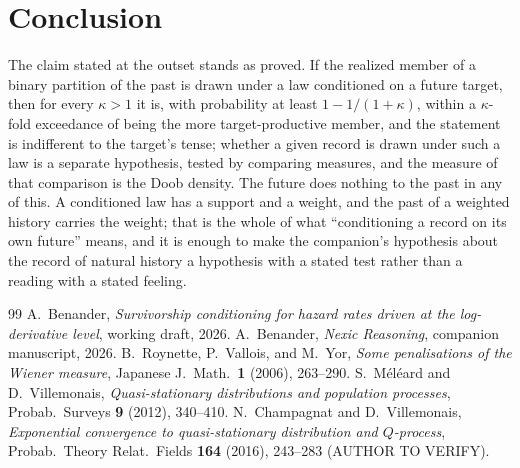 \documentclass[11pt]{article}
\theoremstyle{plain}
\theoremstyle{definition}
\theoremstyle{remark}
\begin{document}
\section{Conclusion}\label{sec:conclusion}

The claim stated at the outset stands as proved. If the realized member
of a binary partition of the past is drawn under a law conditioned on a
future target, then for every $\kappa>1$ it is, with probability at least
$1-1/(1+\kappa)$, within a $\kappa$-fold exceedance of being the more
target-productive member, and the statement is indifferent to the
target's tense; whether a given record is drawn under such a law is a
separate hypothesis, tested by comparing measures, and the measure of
that comparison is the Doob density. The future does nothing to the past
in any of this. A conditioned law has a support and a weight, and the
past of a weighted history carries the weight; that is the whole of what
``conditioning a record on its own future'' means, and it is enough to
make the companion's hypothesis about the record of natural history a
hypothesis with a stated test rather than a reading with a stated
feeling.

\begin{thebibliography}{99}\small
{} A.~Benander, \emph{Survivorship conditioning for hazard
rates driven at the log-derivative level}, working draft, 2026.
 A.~Benander, \emph{Nexic Reasoning}, companion manuscript,
2026.
 B.~Roynette, P.~Vallois, and M.~Yor, \emph{Some penalisations
of the Wiener measure}, Japanese J.\ Math.\ \textbf{1} (2006), 263--290.
 S.~M\'el\'eard and D.~Villemonais, \emph{Quasi-stationary
distributions and population processes}, Probab.\ Surveys \textbf{9} (2012),
340--410.
 N.~Champagnat and D.~Villemonais, \emph{Exponential
convergence to quasi-stationary distribution and $Q$-process}, Probab.\
Theory Relat.\ Fields \textbf{164} (2016), 243--283 (AUTHOR TO VERIFY).
\end{thebibliography}
\end{document}
